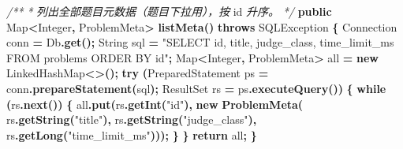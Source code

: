 \documentclass[
  11pt,
]{ctexart}
\newenvironment{Shaded}{\begin{snugshade}}{\end{snugshade}}
\newcommand{\BuiltInTok}[1]{#1}
\newcommand{\CommentTok}[1]{\textcolor[rgb]{0.56,0.35,0.01}{\textit{#1}}}
\newcommand{\ControlFlowTok}[1]{\textcolor[rgb]{0.13,0.29,0.53}{\textbf{#1}}}
\newcommand{\FunctionTok}[1]{\textcolor[rgb]{0.13,0.29,0.53}{\textbf{#1}}}
\newcommand{\KeywordTok}[1]{\textcolor[rgb]{0.13,0.29,0.53}{\textbf{#1}}}
\newcommand{\NormalTok}[1]{#1}
\newcommand{\OperatorTok}[1]{\textcolor[rgb]{0.81,0.36,0.00}{\textbf{#1}}}
\newcommand{\StringTok}[1]{\textcolor[rgb]{0.31,0.60,0.02}{#1}}
\begin{document}
\begin{Shaded}
\begin{Highlighting}[]
    \CommentTok{/**}
     \CommentTok{*} \CommentTok{列出全部题目元数据（题目下拉用），按}\NormalTok{ id }\CommentTok{升序。}
     \CommentTok{*/}
    \KeywordTok{public} \BuiltInTok{Map}\OperatorTok{\textless{}}\BuiltInTok{Integer}\OperatorTok{,}\NormalTok{ ProblemMeta}\OperatorTok{\textgreater{}} \FunctionTok{listMeta}\OperatorTok{()} \KeywordTok{throws} \BuiltInTok{SQLException} \OperatorTok{\{}
        \BuiltInTok{Connection}\NormalTok{ conn }\OperatorTok{=}\NormalTok{ Db}\OperatorTok{.}\FunctionTok{get}\OperatorTok{();}
        \BuiltInTok{String}\NormalTok{ sql }\OperatorTok{=} \StringTok{"SELECT id, title, judge\_class, time\_limit\_ms FROM problems ORDER BY id"}\OperatorTok{;}
        \BuiltInTok{Map}\OperatorTok{\textless{}}\BuiltInTok{Integer}\OperatorTok{,}\NormalTok{ ProblemMeta}\OperatorTok{\textgreater{}}\NormalTok{ all }\OperatorTok{=} \KeywordTok{new} \BuiltInTok{LinkedHashMap}\OperatorTok{\textless{}\textgreater{}();}
        \ControlFlowTok{try} \OperatorTok{(}\BuiltInTok{PreparedStatement}\NormalTok{ ps }\OperatorTok{=}\NormalTok{ conn}\OperatorTok{.}\FunctionTok{prepareStatement}\OperatorTok{(}\NormalTok{sql}\OperatorTok{);}
             \BuiltInTok{ResultSet}\NormalTok{ rs }\OperatorTok{=}\NormalTok{ ps}\OperatorTok{.}\FunctionTok{executeQuery}\OperatorTok{())} \OperatorTok{\{}
            \ControlFlowTok{while} \OperatorTok{(}\NormalTok{rs}\OperatorTok{.}\FunctionTok{next}\OperatorTok{())} \OperatorTok{\{}
\NormalTok{                all}\OperatorTok{.}\FunctionTok{put}\OperatorTok{(}\NormalTok{rs}\OperatorTok{.}\FunctionTok{getInt}\OperatorTok{(}\StringTok{"id"}\OperatorTok{),} \KeywordTok{new} \FunctionTok{ProblemMeta}\OperatorTok{(}
\NormalTok{                    rs}\OperatorTok{.}\FunctionTok{getString}\OperatorTok{(}\StringTok{"title"}\OperatorTok{),}
\NormalTok{                    rs}\OperatorTok{.}\FunctionTok{getString}\OperatorTok{(}\StringTok{"judge\_class"}\OperatorTok{),}
\NormalTok{                    rs}\OperatorTok{.}\FunctionTok{getLong}\OperatorTok{(}\StringTok{"time\_limit\_ms"}\OperatorTok{)));}
            \OperatorTok{\}}
        \OperatorTok{\}}
        \ControlFlowTok{return}\NormalTok{ all}\OperatorTok{;}
    \OperatorTok{\}}


\end{Highlighting}
\end{Shaded}
\end{document}
